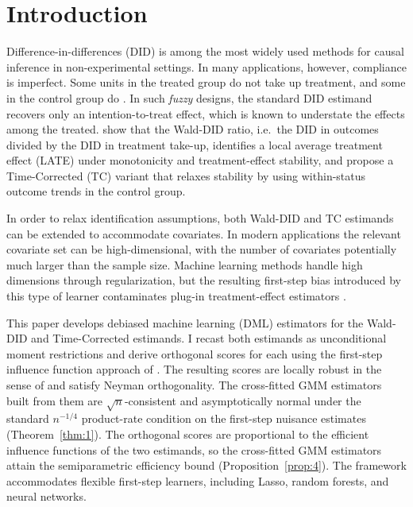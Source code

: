 \section{Introduction}

Difference-in-differences (DID) is among the most widely used methods for causal inference in non-experimental settings. In many applications, however, compliance is imperfect. Some units in the treated group do not take up treatment, and some in the control group do \citep[e.g.,][]{duflo2001schooling, cornelissen2018benefits, kennedy2023hidden}. In such \textit{fuzzy} designs, the standard DID estimand recovers only an intention-to-treat effect, which is known to understate the effects among the treated. \cite{fuzzy2018} show that the Wald-DID ratio, i.e.\ the DID in outcomes divided by the DID in treatment take-up, identifies a local average treatment effect (LATE) under monotonicity and treatment-effect stability, and propose a Time-Corrected (TC) variant that relaxes stability by using within-status outcome trends in the control group.

In order to relax identification assumptions, both Wald-DID and TC estimands can be extended to accommodate covariates. In modern applications the relevant covariate set can be high-dimensional, with the number of covariates potentially much larger than the sample size. Machine learning methods handle high dimensions through regularization, but the resulting first-step bias introduced by this type of learner contaminates plug-in treatment-effect estimators \citep{DDML2018}.

This paper develops debiased machine learning (DML) estimators for the Wald-DID and Time-Corrected estimands. I recast both estimands as unconditional moment restrictions and derive orthogonal scores for each using the first-step influence function approach of \citet{ichimura2022influence}. The resulting scores are locally robust in the sense of \citet{chernozhukov2022locally} and satisfy Neyman orthogonality. The cross-fitted GMM estimators built from them are $\sqrt{n}$-consistent and asymptotically normal under the standard $n^{-1/4}$ product-rate condition on the first-step nuisance estimates (Theorem~\ref{thm:1}). The orthogonal scores are proportional to the efficient influence functions of the two estimands, so the cross-fitted GMM estimators attain the semiparametric efficiency bound (Proposition~\ref{prop:4}). The framework accommodates flexible first-step learners, including Lasso, random forests, and neural networks.

